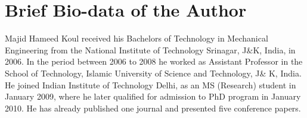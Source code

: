 \chapter*{Brief Bio-data of the Author}
Majid Hameed Koul received his Bachelors of Technology in Mechanical Engineering from the National Institute of Technology Srinagar, J$\&$K, India, in 2006. In the period between 2006 to 2008 he worked as Assistant Professor in the School of Technology, Islamic University of Science and Technology, J\& K, India. He joined Indian Institute of Technology Delhi, as an MS (Research) student in January 2009, where he later qualified for admission to PhD program in January 2010. He has already published one journal and presented five conference papers.